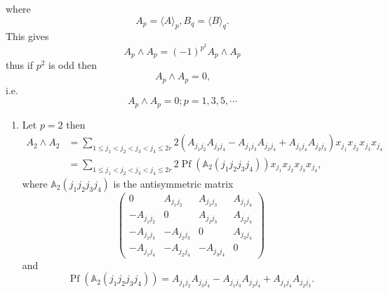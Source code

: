\documentclass[aps, preprint]{revtex4}
\begin{document}
where
\begin{equation}A_{p} = \langle A \rangle _{p} ,B_{q} = \langle B \rangle _{q}\text{.}
\end{equation}This gives
\begin{equation}A_{p} \wedge A_{p} =\left ( -1\right )^{p^{2}} A_{p} \wedge A_{p}
\end{equation}thus if $p^{2}$ is odd then
\begin{equation}A_{p} \wedge A_{p} =0\text{,}
\end{equation}i.e.
\begin{equation}A_{p} \wedge A_{p} =0 ;p =1 ,3 ,5 ,\cdots 
\end{equation}


\begin{enumerate}
\item Let $p =2$ then
\begin{align}A_{2} \wedge A_{2} &  =\sum _{1 \leq j_{1} <j_{2} <j_{3} <j_{4} \leq 2 r}2 \left (A_{j_{1} j_{2}} A_{j_{3} j_{4}} -A_{j_{1} j_{3}} A_{j_{2} j_{4}} +A_{j_{1} j_{4}} A_{j_{2} j_{3}}\right ) x_{j_{1}} x_{j_{2}} x_{j_{3}} x_{j_{4}} \\
 &  =\sum _{1 \leq j_{1} <j_{2} <j_{3} <j_{4} \leq 2 r}2 \ensuremath{\operatorname*{Pf}} \left (\mathbb{A}_{2} \left (j_{1} j_{2} j_{3} j_{4}\right )\right ) x_{j_{1}} x_{j_{2}} x_{j_{3}} x_{j_{4}}\text{,}\end{align}where $\mathbb{A}_{2} \left (j_{1} j_{2} j_{3} j_{4}\right )$ is the antisymmetric matrix
\begin{equation}\left (\begin{array}{cccc}0 & A_{j_{1} j_{2}} & A_{j_{1} j_{3}} & A_{j_{1} j_{4}} \\
 -A_{j_{1} j_{2}} & 0 & A_{j_{2} j_{3}} & A_{j_{2} j_{4}} \\
 -A_{j_{1} j_{3}} &  -A_{j_{2} j_{3}} & 0 & A_{j_{3} j_{4}} \\
 -A_{j_{1} j_{4}} &  -A_{j_{2} j_{4}} &  -A_{j_{3} j_{4}} & 0\end{array}\right )
\end{equation}and
\begin{equation}\ensuremath{\operatorname*{Pf}} \left (\mathbb{A}_{2} \left (j_{1} j_{2} j_{3} j_{4}\right )\right ) =A_{j_{1} j_{2}} A_{j_{3} j_{4}} -A_{j_{1} j_{3}} A_{j_{2} j_{4}} +A_{j_{1} j_{4}} A_{j_{2} j_{3}}\text{.}
\end{equation}


\end{enumerate}
\end{document}
